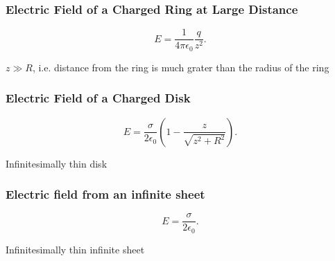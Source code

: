 \subsubsection{Electric Field of a Charged Ring at Large Distance}
\begin{equation*}
  E = \frac{1}{4 \pi \epsilon_0} \frac{q}{z^2}
.\end{equation*}

\begin{assumptions}
  \item $z \gg R$, i.e. distance from the ring is much grater than the radius of the ring
\end{assumptions}

\begin{symbols}
\end{symbols}


\subsubsection{Electric Field of a Charged Disk}
\begin{equation*}
  E = \frac{\sigma}{2 \epsilon_0} \left( 1 - \frac{z}{\sqrt{z^2 + R^2}} \right)
.\end{equation*}

\begin{assumptions}
  \item Infinitesimally thin disk
\end{assumptions}

\begin{symbols}
\end{symbols}

\subsubsection{Electric field from an infinite sheet}
\begin{equation*}
  E = \frac{\sigma}{2 \epsilon_0}
.\end{equation*}

\begin{assumptions}
  \item Infinitesimally thin infinite sheet
\end{assumptions}

